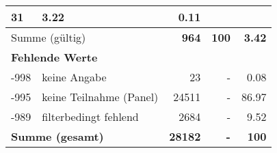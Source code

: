 \begin{longtable}{lXrrr}
       \num{31} &
       \num[round-mode=places,round-precision=2]{3.22} &
         \num[round-mode=places,round-precision=2]{0.11} \\
     \midrule
     \multicolumn{2}{l}{Summe (gültig)} &
       \textbf{\num{964}} &
     \textbf{100} &
       \textbf{\num[round-mode=places,round-precision=2]{3.42}} \\
     \multicolumn{5}{l}{\textbf{Fehlende Werte}}\\
       -998 &
       keine Angabe &
         \num{23} &
        - &
         \num[round-mode=places,round-precision=2]{0.08} \\
       -995 &
       keine Teilnahme (Panel) &
         \num{24511} &
        - &
         \num[round-mode=places,round-precision=2]{86.97} \\
       -989 &
       filterbedingt fehlend &
         \num{2684} &
        - &
         \num[round-mode=places,round-precision=2]{9.52} \\
     \midrule
     \multicolumn{2}{l}{\textbf{Summe (gesamt)}} &
          \textbf{\num{28182}} &
        \textbf{-} &
        \textbf{100} \\
     \bottomrule
     \end{longtable}
     
